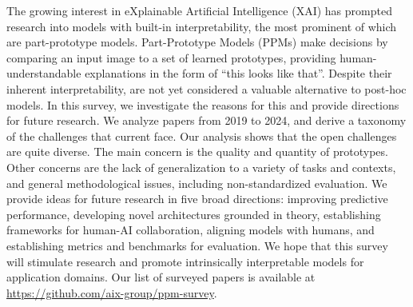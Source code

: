 The growing interest in eXplainable Artificial Intelligence (XAI) has prompted research into models with built-in interpretability, the most prominent of which are part-prototype models.
Part-Prototype Models (PPMs) make decisions by comparing an input image to a set of learned prototypes, providing human-understandable explanations in the form of ``this looks like that''.
Despite their inherent interpretability, \ppms are not yet considered a valuable alternative to post-hoc models.
In this survey, we investigate the reasons for this and provide directions for future research.
We analyze papers from 2019 to 2024, and derive a taxonomy of the challenges that current \ppms face. 
Our analysis shows that the open challenges are quite diverse. The main concern is the quality and quantity of prototypes. Other concerns are the lack of generalization to a variety of tasks and contexts, and general methodological issues, including non-standardized evaluation. 
We provide ideas for future research in five broad directions: improving predictive performance, developing novel architectures grounded in theory, establishing frameworks for human-AI collaboration, aligning models with humans, and establishing metrics and benchmarks for evaluation.
We hope that this survey will stimulate research and promote intrinsically interpretable models for application domains.
Our list of surveyed papers is available at \url{https://github.com/aix-group/ppm-survey}.









